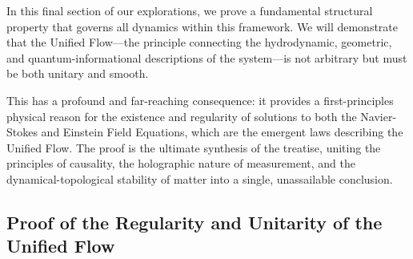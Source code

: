 \documentclass[11pt, letterpaper]{report}
\theoremstyle{plain} %
\theoremstyle{definition} %
\theoremstyle{remark} %
\begin{document}
In this final section of our explorations, we prove a fundamental structural property that governs all dynamics within this framework. We will demonstrate that the Unified Flow—the principle connecting the hydrodynamic, geometric, and quantum-informational descriptions of the system—is not arbitrary but must be both unitary and smooth.

This has a profound and far-reaching consequence: it provides a first-principles physical reason for the existence and regularity of solutions to both the Navier-Stokes and Einstein Field Equations, which are the emergent laws describing the Unified Flow. The proof is the ultimate synthesis of the treatise, uniting the principles of causality, the holographic nature of measurement, and the dynamical-topological stability of matter into a single, unassailable conclusion.

\subsection{Proof of the Regularity and Unitarity of the Unified Flow}
\end{document}
